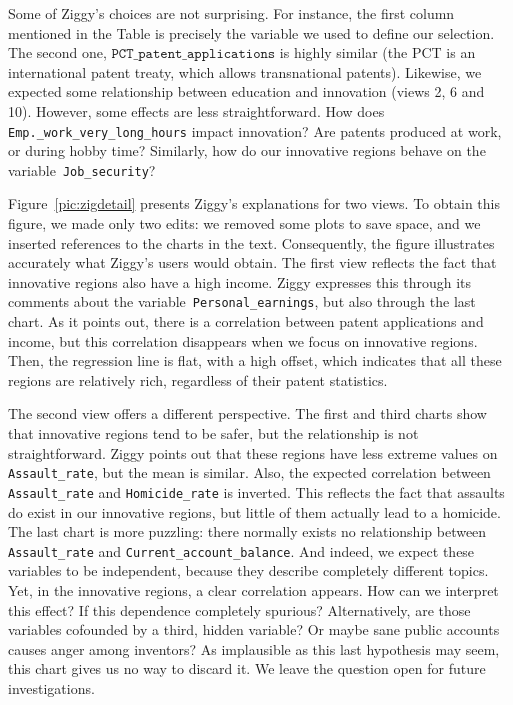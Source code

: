 Some of Ziggy's choices are not surprising. For
instance, the first column mentioned in the Table is precisely the variable we
used to define our selection. The second one,
$\texttt{PCT\_patent\_applications}$ is highly similar (the PCT is an
international patent treaty, which allows transnational patents). Likewise, we
expected some relationship between education and innovation (views 2, 6 and
10). However, some effects are less straightforward. How does
\texttt{Emp.\_work\_very\_long\_hours} impact innovation? Are patents produced
at work, or during hobby time? Similarly, how do our innovative regions behave
on the variable~\texttt{Job\_security}?

Figure~\ref{pic:zigdetail} presents Ziggy's explanations for two views. To
obtain this figure, we made only two edits: we removed some plots to save
space, and we inserted references to the charts in the text. Consequently, the
figure illustrates accurately what Ziggy's users would obtain. The first view
reflects the fact that innovative regions also have a high income. Ziggy
expresses this through its comments about the
variable~\texttt{Personal\_earnings}, but also through the last chart. As it
points out, there is a correlation between patent applications and income, but
this correlation disappears when we focus on innovative regions. Then, the
regression line is flat, with a high offset, which indicates that all these
regions are relatively rich, regardless of their patent statistics.

The second view offers a different perspective. The first and third charts show
that innovative regions tend to be safer, but the relationship is not
straightforward. Ziggy points out that these regions have less extreme values
on \texttt{Assault\_rate}, but the mean is similar. Also, the expected
correlation between \texttt{Assault\_rate} and \texttt{Homicide\_rate} is
inverted. This reflects the fact that assaults do exist in our innovative
regions, but little of them actually lead to a homicide. The last chart is more
puzzling: there normally exists no relationship between \texttt{Assault\_rate}
and \texttt{Current\_ac\-count\_balance}. And indeed, we expect these variables
to be independent, because they describe completely different topics. Yet,
in the innovative regions, a clear correlation appears. How can we interpret
this effect? If this dependence completely spurious? Alternatively, are those
variables cofounded by a third, hidden variable? Or maybe sane public accounts
causes anger among inventors? As implausible as this last hypothesis may seem, this
chart gives us no way to discard it. We leave the question open for future
investigations.

